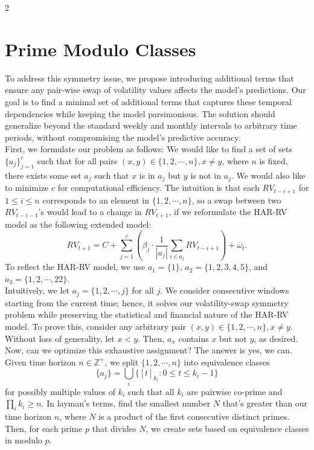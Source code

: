 ﻿\documentclass[a4paper]{article}
\begin{document}
\begin{multicols}{2}
\section{Prime Modulo Classes}
\noindent To address this symmetry issue, we propose introducing additional terms that ensure any pair-wise swap of volatility values affects the model's predictions. Our goal is to find a minimal set of additional terms that captures these temporal dependencies while keeping the model parsimonious. The solution should generalize beyond the standard weekly and monthly intervals to arbitrary time periods, without compromising the model's predictive accuracy.
\vspace{0.3cm}
\\ First, we formulate our problem as follows: We would like to find a set of sets $\{a_j\}_{j=1}^c$ such that for all pairs $(x, y) \in \{1, 2, \cdots, n\}, x \neq y$, where $n$ is fixed, there exists some set $a_j$ such that $x$ is in $a_j$ but $y$ is not in $a_j$. We would also like to minimize $c$ for computational efficiency. The intuition is that each $RV_{t-i+1}$ for $1 \leq i \leq n$ corresponds to an element in $\{1, 2, \cdots, n\}$, so a swap between two $RV_{t-i-1}$'s would lead to a change in $RV_{t+1}$, if we reformulate the HAR-RV model as the following extended model: $$RV_{t+1} = C + \sum_{j = 1}^c\left(\beta_j \cdot \frac{1}{|a_j|} \sum_{i \in a_j} RV_{t-i+1}\right) + \overline{\omega}_t.$$ To reflect the HAR-RV model, we use $a_1 = \{1\}$, $a_2 = \{1, 2, 3, 4, 5\}$, and $a_3 = \{1, 2, \cdots, 22\}$.
\vspace{0.3cm}
\\ Intuitively, we let $a_j = \{1, 2, \cdots, j\}$ for all $j$. We consider consecutive windows starting from the current time; hence, it solves our volatility-swap symmetry problem while preserving the statistical and financial nature of the HAR-RV model. To prove this, consider any arbitrary pair $(x, y) \in \{1, 2, \cdots, n\}, x \neq y$. Without loss of generality, let $x<y$. Then, $a_x$ contains $x$ but not $y$, as desired. Now, can we optimize this exhaustive assignment? The answer is yes, we can.
\vspace{0.3cm}
\\ Given time horizon $n\in \mathbb{Z}^+$, we split $\{1, 2, \cdots, n\}$ into equivalence classes $$\{a_j\} = \bigcup_{i} \{[t]_{k_i}: 0 \leq t \leq k_i-1\}$$ for possibly multiple values of $k_i$ such that all $k_i$ are pairwise co-prime and $\displaystyle\prod_i k_i \geq n$.  In layman's terms, find the smallest number $N$ that's greater than our time horizon $n$, where $N$ is a product of the first consecutive distinct primes. Then, for each prime $p$ that divides $N$, we create sets based on equivalence classes in modulo $p$.

\end{multicols}
\end{document}
